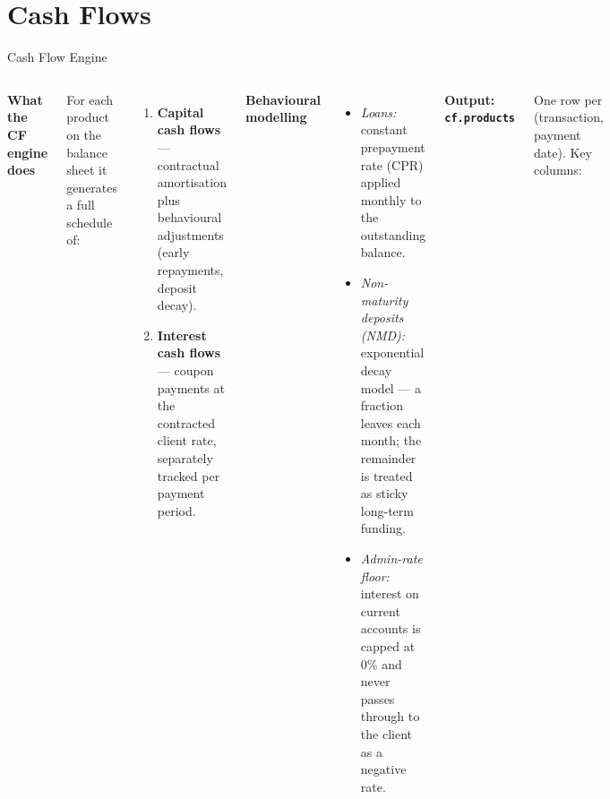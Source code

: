 \documentclass[aspectratio=169,10pt]{beamer}
\begin{document}
\section{Cash Flows}

\begin{frame}{Cash Flow Engine}

  \begin{columns}[T]
      \textbf{What the CF engine does}

      For each product on the balance sheet it generates a full schedule of:
      \begin{enumerate}
        \item \textbf{Capital cash flows} — contractual amortisation plus
              behavioural adjustments (early repayments, deposit decay).
        \item \textbf{Interest cash flows} — coupon payments at the
              contracted client rate, separately tracked per payment period.
      \end{enumerate}

      \vspace{6pt}
      \textbf{Behavioural modelling}
      \begin{itemize}
        \item \textit{Loans:} constant prepayment rate (CPR) applied monthly
              to the outstanding balance.
        \item \textit{Non-maturity deposits (NMD):} exponential decay
              model — a fraction leaves each month; the remainder is treated
              as sticky long-term funding.
        \item \textit{Admin-rate floor:} interest on current accounts is
              capped at 0\% and never passes through to the client as
              a negative rate.
      \end{itemize}

      \textbf{Output: \texttt{cf.products}}

      One row per (transaction, payment date). Key columns:


\end{columns}
\end{frame}
\end{document}
